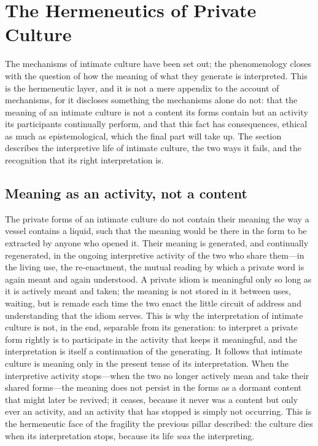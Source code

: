 \section{The Hermeneutics of Private Culture}
\label{p24:sec:hermeneutics}

\noindent
The mechanisms of intimate culture have been set out; the phenomenology closes with the question of how the meaning of what they generate is interpreted. This is the hermeneutic layer, and it is not a mere appendix to the account of mechanisms, for it discloses something the mechanisms alone do not: that the meaning of an intimate culture is not a content its forms contain but an activity its participants continually perform, and that this fact has consequences, ethical as much as epistemological, which the final part will take up. The section describes the interpretive life of intimate culture, the two ways it fails, and the recognition that its right interpretation is.

\subsection*{Meaning as an activity, not a content}

The private forms of an intimate culture do not contain their meaning the way a vessel contains a liquid, such that the meaning would be there in the form to be extracted by anyone who opened it. Their meaning is generated, and continually regenerated, in the ongoing interpretive activity of the two who share them---in the living use, the re-enactment, the mutual reading by which a private word is again meant and again understood. A private idiom is meaningful only so long as it is actively meant and taken; the meaning is not stored in it between uses, waiting, but is remade each time the two enact the little circuit of address and understanding that the idiom serves. This is why the interpretation of intimate culture is not, in the end, separable from its generation: to interpret a private form rightly is to participate in the activity that keeps it meaningful, and the interpretation is itself a continuation of the generating. It follows that intimate culture is meaning only in the present tense of its interpretation. When the interpretive activity stops---when the two no longer actively mean and take their shared forms---the meaning does not persist in the forms as a dormant content that might later be revived; it ceases, because it never was a content but only ever an activity, and an activity that has stopped is simply not occurring. This is the hermeneutic face of the fragility the previous pillar described: the culture dies when its interpretation stops, because its life \emph{was} the interpreting.

